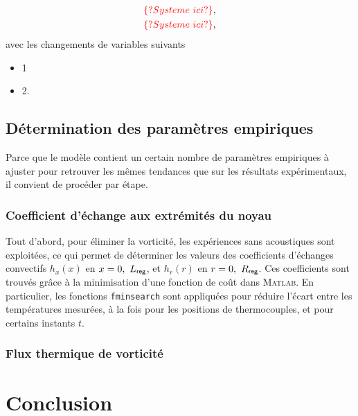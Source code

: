 \begin{subequations}
	\begin{align}
		\textcolor{red}{\{?Systeme\ ici?\}},\label{eq:1_Transitoire}\\
		\textcolor{red}{\{?Systeme\ ici?\}},\label{eq:2_Transitoire}
	\end{align}
	\label{eq:SystemeEq_Transitoire}
\end{subequations}
avec les changements de variables suivants

\begin{itemize} \color{red}
	\item 1
	\item 2.
\end{itemize}

\subsection{Détermination des paramètres empiriques}
Parce que le modèle contient un certain nombre de paramètres empiriques à ajuster pour retrouver les mêmes tendances que sur les résultats expérimentaux, il convient de procéder par étape.

\subsubsection{Coefficient d'échange aux extrémités du noyau}
Tout d'abord, pour éliminer la vorticité, les expériences sans acoustiques sont exploitées, ce qui permet de déterminer les valeurs des coefficients d'échanges convectifs $h_x(x)$ en $x=0,\ L_{\sf reg}$, et $h_r(r)$ en $r=0,\ R_{\sf reg}$. Ces coefficients sont trouvés grâce à la minimisation d'une fonction de coût dans \textsc{Matlab}\textss\textregistered. En particulier, les fonctions \texttt{fminsearch}  sont appliquées pour réduire l'écart entre les températures mesurées, à la fois pour  les positions de thermocouples, et pour certains instants $t$.

\subsubsection{Flux thermique de vorticité}

\section{Conclusion}